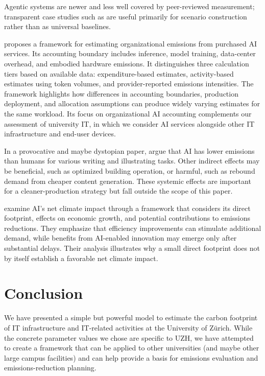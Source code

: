 \documentclass[11pt]{article}
\begin{document}
Agentic systems are newer and less well covered by peer-reviewed measurement;
transparent case studies such as \textcite{couch:claude:code:energy} are useful
primarily for scenario construction rather than as universal baselines.

\textcite{watershed:2026} proposes a framework for estimating organizational
emissions from purchased AI services. Its accounting boundary includes
inference, model training, data-center overhead, and embodied hardware
emissions. It distinguishes three calculation tiers based on available data:
expenditure-based estimates, activity-based estimates using token volumes, and
provider-reported emissions intensities. The framework highlights how
differences in accounting boundaries, production deployment, and allocation
assumptions can produce widely varying estimates for the same workload. Its
focus on organizational AI accounting complements our assessment of university
IT, in which we consider AI services alongside other IT infrastructure and
end-user devices.

In a provocative and maybe dystopian paper, \textcite{tomlinson:2024:carbon}
argue that AI has lower emissions than humans for various writing and
illustrating tasks. Other indirect effects may be beneficial, such as optimized
building operation, or harmful, such as rebound demand from cheaper content
generation. These systemic effects are important for a cleaner-production
strategy but fall outside the scope of this paper.

\textcite{sterman:2026} examine AI's net climate impact through a framework that
considers its direct footprint, effects on economic growth, and potential
contributions to emissions reductions. They emphasize that efficiency
improvements can stimulate additional demand, while benefits from AI-enabled
innovation may emerge only after substantial delays. Their analysis illustrates
why a small direct footprint does not by itself establish a favorable net
climate impact.

\section{Conclusion}

We have presented a simple but powerful model to estimate the carbon footprint
of IT infrastructure and IT-related activities at the University of Zürich.
While the concrete parameter values we chose are specific to UZH, we have
attempted to create a framework that can be applied to other universities (and
maybe other large campus facilities) and can help provide a basis for emissions
evaluation and emissions-reduction planning.
\end{document}
